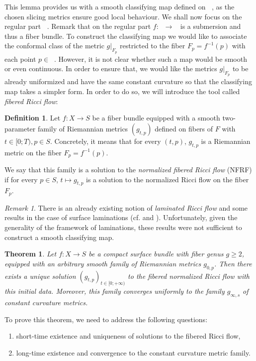 \documentclass{article}
\DeclareMathOperator{\xreg}{X_{\text{reg.}}}
\DeclareMathOperator{\sreg}{S_{\text{reg.}}}
\DeclareMathOperator{\ssing}{S_{\text{sing.}}}
\theoremstyle{plain}
\newtheorem{thm}{Theorem}[section]
\theoremstyle{remark}
\newtheorem*{rem}{Remark}
\theoremstyle{definition}
\newtheorem{defin}{Definition}[section]
\begin{document}
This lemma provides us with a smooth classifying map defined on $\ssing$, as the chosen slicing metrics ensure good local behaviour. We shall now focus on the regular part $\sreg$. Remark that on the regular part $f:\xreg \to \sreg$ is a submersion and thus a fiber bundle. To construct the classifying map we would like to associate the conformal class of the metric $g|_{F_p}$ restricted to the fiber $F_p=f^{-1}(p)$ with each point $p\in \sreg$. However, it is not clear whether such a map would be smooth or even continuous. In order to ensure that, we would like the metrics $g|_{F_p}$ to be already uniformized and have the same constant curvature so that the classifying map takes a simpler form. In order to do so, we will introduce the tool called \emph{fibered Ricci flow}\thinspace:
\begin{defin}
    Let $f:X\to S$ be a fiber bundle equipped with a smooth two-parameter family of Riemannian metrics $(g_{t,p})$ defined on fibers of $F$ with $t\in [0;T), p\in S$. Concretely, it means that for every $(t,p)$, $g_{t,p}$ is a Riemannian metric on the fiber $F_p = f^{-1}(p)$. \par 
    We say that this family is a solution to the \emph{normalized fibered Ricci flow} (NFRF) if for every $p\in S$, $t\mapsto g_{t,p}$ is a solution to the normalized Ricci flow on the fiber $F_p$. 
\end{defin} 
\begin{rem}
    There is an already existing notion of \emph{laminated Ricci flow} and some results in the case of surface laminations (cf. \cite{MunizVerjovsky} and \cite{Verjovsky}). Unfortunately, given the generality of the framework of laminations, these results were not sufficient to construct a smooth classifying map.
\end{rem}
\begin{thm}\label{NFRF}
    Let $f:X\to S$ be a compact surface bundle with fiber genus $g\geq 2$, equipped with an arbitrary smooth family of Riemannian metrics $g_{0,p}$. Then there exists a unique solution $(g_{t,p})_{t\in[0;+\infty)}$ to the fibered normalized Ricci flow with this initial data. Moreover, this family converges uniformly to the family $g_{\infty,s}$ of constant curvature metrics.
\end{thm}
To prove this theorem, we need to address the following questions\thinspace:
\begin{enumerate}
    \item short-time existence and uniqueness of solutions to the fibered Ricci flow,
    \item long-time existence and convergence to the constant curvature metric family.
\end{enumerate}
\end{document}
